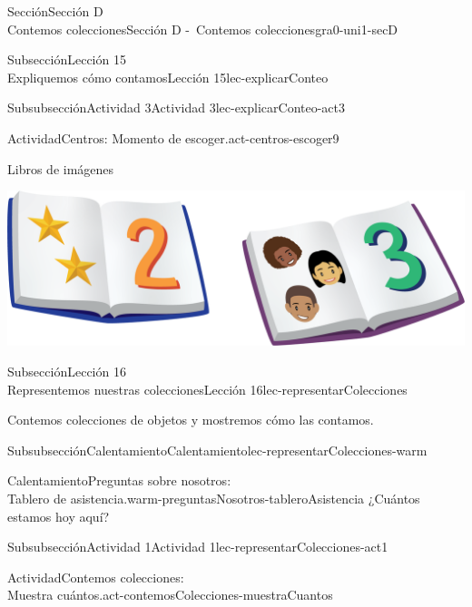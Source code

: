 \begin{sectionptx}{Sección}{{\Large Sección D\\}Contemos colecciones}{}{Sección D -~Contemos colecciones}{}{}{gra0-uni1-secD}
\begin{subsectionptx}{Subsección}{{\normalsize Lección 15\\[-0.05cm]}Expliquemos cómo contamos}{}{Lección 15}{}{}{lec-explicarConteo}
\begin{subsubsectionptx}{Subsubsección}{Actividad 3}{}{Actividad 3}{}{}{lec-explicarConteo-act3}
\begin{activity}{Actividad}{Centros: Momento de escoger.}{act-centros-escoger9}
\begin{sidebyside}{2}{0.025}{0.025}{0.05}
\begin{sbspanel}{0.45}%
Libros de imágenes%
\par
\includegraphics[max width=\linewidth, center]{external/png-source/K.1.D Beta Student Workbooks.Books.png}
\end{sbspanel}%
\end{sidebyside}%
\end{activity}%
\end{subsubsectionptx}
\end{subsectionptx}
%
%
\typeout{************************************************}
\typeout{************************************************}
%
\begin{subsectionptx}{Subsección}{{\normalsize Lección 16\\[-0.05cm]}Representemos nuestras colecciones}{}{Lección 16}{}{}{lec-representarColecciones}
\begin{introduction}{}%
Contemos colecciones de objetos y mostremos cómo las contamos.%
\end{introduction}%
%
%
\typeout{************************************************}
\typeout{************************************************}
%
\begin{subsubsectionptx}{Subsubsección}{Calentamiento}{}{Calentamiento}{}{}{lec-representarColecciones-warm}
\begin{exploration}{Calentamiento}{Preguntas sobre nosotros:\\Tablero de asistencia.}{warm-preguntasNosotros-tableroAsistencia}%
¿Cuántos estamos hoy aquí?%
\end{exploration}%
\end{subsubsectionptx}
%
%
\typeout{************************************************}
\typeout{************************************************}
%
\begin{subsubsectionptx}{Subsubsección}{Actividad 1}{}{Actividad 1}{}{}{lec-representarColecciones-act1}
\begin{activity}{Actividad}{Contemos colecciones:\\Muestra cuántos.}{act-contemosColecciones-muestraCuantos}%

\end{activity}
\end{subsubsectionptx}
\end{subsectionptx}
\end{sectionptx}
